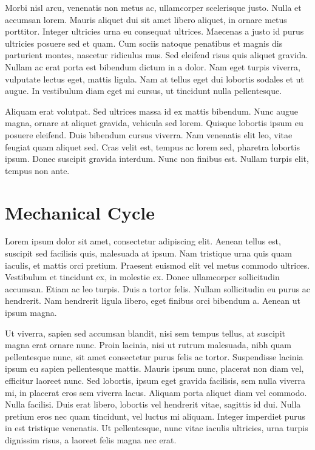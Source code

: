 Morbi nisl arcu, venenatis non metus ac, ullamcorper scelerisque justo. Nulla et accumsan lorem. Mauris aliquet dui sit amet libero aliquet, in ornare metus porttitor. Integer ultricies urna eu consequat ultrices. Maecenas a justo id purus ultricies posuere sed et quam. Cum sociis natoque penatibus et magnis dis parturient montes, nascetur ridiculus mus. Sed eleifend risus quis aliquet gravida. Nullam ac erat porta est bibendum dictum in a dolor. Nam eget turpis viverra, vulputate lectus eget, mattis ligula. Nam at tellus eget dui lobortis sodales et ut augue. In vestibulum diam eget mi cursus, ut tincidunt nulla pellentesque.

Aliquam erat volutpat. Sed ultrices massa id ex mattis bibendum. Nunc augue magna, ornare at aliquet gravida, vehicula sed lorem. Quisque lobortis ipsum eu posuere eleifend. Duis bibendum cursus viverra. Nam venenatis elit leo, vitae feugiat quam aliquet sed. Cras velit est, tempus ac lorem sed, pharetra lobortis ipsum. Donec suscipit gravida interdum. Nunc non finibus est. Nullam turpis elit, tempus non ante.

\section{Mechanical Cycle}

Lorem ipsum dolor sit amet, consectetur adipiscing elit. Aenean tellus est, suscipit sed facilisis quis, malesuada at ipsum. Nam tristique urna quis quam iaculis, et mattis orci pretium. Praesent euismod elit vel metus commodo ultrices. Vestibulum et tincidunt ex, in molestie ex. Donec ullamcorper sollicitudin accumsan. Etiam ac leo turpis. Duis a tortor felis. Nullam sollicitudin eu purus ac hendrerit. Nam hendrerit ligula libero, eget finibus orci bibendum a. Aenean ut ipsum magna.

Ut viverra, sapien sed accumsan blandit, nisi sem tempus tellus, at suscipit magna erat ornare nunc. Proin lacinia, nisi ut rutrum malesuada, nibh quam pellentesque nunc, sit amet consectetur purus felis ac tortor. Suspendisse lacinia ipsum eu sapien pellentesque mattis. Mauris ipsum nunc, placerat non diam vel, efficitur laoreet nunc. Sed lobortis, ipsum eget gravida facilisis, sem nulla viverra mi, in placerat eros sem viverra lacus. Aliquam porta aliquet diam vel commodo. Nulla facilisi. Duis erat libero, lobortis vel hendrerit vitae, sagittis id dui. Nulla pretium eros nec quam tincidunt, vel luctus mi aliquam. Integer imperdiet purus in est tristique venenatis. Ut pellentesque, nunc vitae iaculis ultricies, urna turpis dignissim risus, a laoreet felis magna nec erat.

